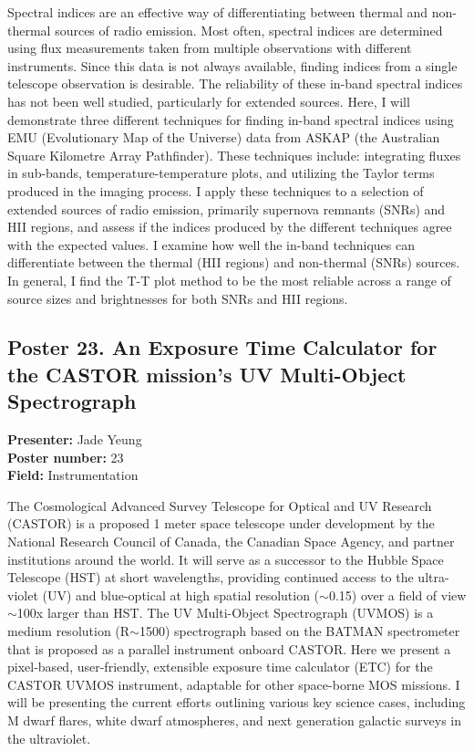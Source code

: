Spectral indices are an effective way of differentiating between thermal and non-thermal sources of radio emission. Most often, spectral indices are determined using flux measurements taken from multiple observations with different instruments. Since this data is not always available, finding indices from a single telescope observation is desirable. The reliability of these in-band spectral indices has not been well studied, particularly for extended sources. Here, I will demonstrate three different techniques for finding in-band spectral indices using EMU (Evolutionary Map of the Universe) data from ASKAP (the Australian Square Kilometre Array Pathfinder). These techniques include: integrating fluxes in sub-bands, temperature-temperature plots, and utilizing the Taylor terms produced in the imaging process. I apply these techniques to a selection of extended sources of radio emission, primarily supernova remnants (SNRs) and HII regions, and assess if the indices produced by the different techniques agree with the expected values. I examine how well the in-band techniques can differentiate between the thermal (HII regions) and non-thermal (SNRs) sources. In general, I find the T-T plot method to be the most reliable across a range of source sizes and brightnesses for both SNRs and HII regions.

\hypertarget{poster-abstract-talk-241}{}\label{poster-abstract-page-talk-219}
\subsection*{Poster 23. An Exposure Time Calculator for the CASTOR mission's UV Multi-Object Spectrograph}
\textbf{Presenter:} Jade Yeung\\
\textbf{Poster number:} 23\\
\textbf{Field:} Instrumentation

The Cosmological Advanced Survey Telescope for Optical and UV Research (CASTOR) is a proposed 1 meter space telescope under development by the National Research Council of Canada, the Canadian Space Agency, and partner institutions around the world. It will serve as a successor to the Hubble Space Telescope (HST) at short wavelengths, providing continued access to the ultra-violet (UV) and blue-optical at high spatial resolution ($\sim$0.15) over a field of view $\sim$100x larger than HST. The UV Multi-Object Spectrograph (UVMOS) is a medium resolution (R$\sim$1500) spectrograph based on the BATMAN spectrometer that is proposed as a parallel instrument onboard CASTOR. Here we present a pixel-based, user-friendly, extensible exposure time calculator (ETC) for the CASTOR UVMOS instrument, adaptable for other space-borne MOS missions. I will be presenting the current efforts outlining various key science cases, including M dwarf flares, white dwarf atmospheres, and next generation galactic surveys in the ultraviolet.

